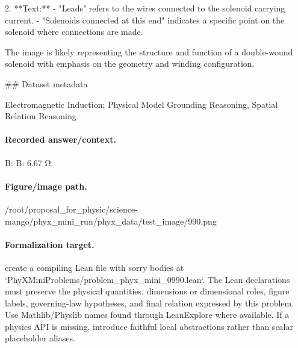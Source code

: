 2. **Text:**
   - "Leads" refers to the wires connected to the solenoid carrying current.
   - "Solenoids connected at this end" indicates a specific point on the solenoid where connections are made.

The image is likely representing the structure and function of a double-wound solenoid with emphasis on the geometry and winding configuration.

\#\# Dataset metadata

Electromagnetic Induction; Physical Model Grounding Reasoning, Spatial Relation Reasoning

\paragraph{Recorded answer/context.}
B: B: 6.67 Ω

\paragraph{Figure/image path.}
/root/proposal\_for\_physic/science-mango/phyx\_mini\_run/phyx\_data/test\_image/990.png

\paragraph{Formalization target.}
create a compiling Lean file with sorry bodies at `PhyXMiniProblems/problem\_phyx\_mini\_0990.lean`. The Lean declarations must preserve the physical quantities, dimensions or dimensional roles, figure labels, governing-law hypotheses, and final relation expressed by this problem.
Use Mathlib/Physlib names found through LeanExplore where available. If a physics API is missing, introduce faithful local abstractions rather than scalar placeholder aliases.

